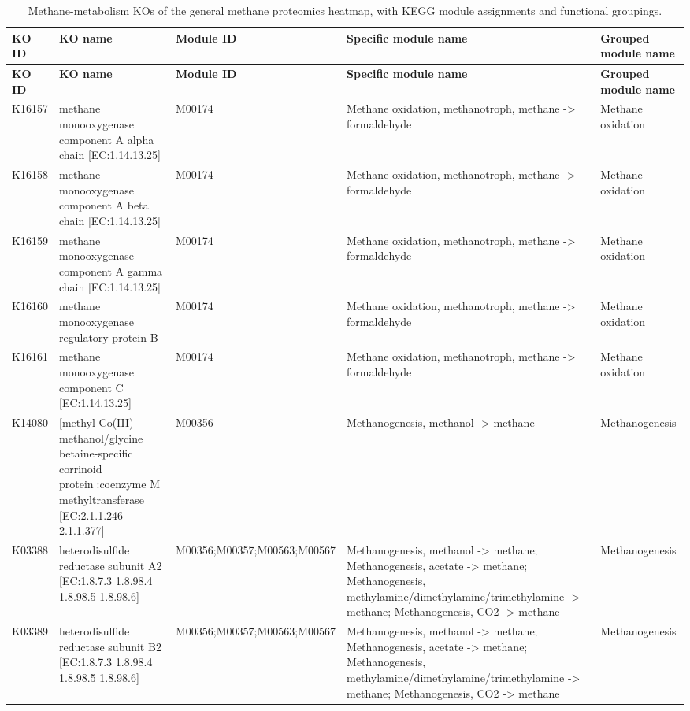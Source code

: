 {\small
\begin{longtable}{|l|p{4.5cm}|p{2.3cm}|p{3.7cm}|p{2.5cm}|}
\caption{Methane-metabolism KOs of the general methane proteomics heatmap, with KEGG module assignments and functional groupings.}\label{table:methane_ko}\\
\hline
\textbf{KO ID} & \textbf{KO name} & \textbf{Module ID} & \textbf{Specific module name} & \textbf{Grouped module name} \\ \hline
\endfirsthead
\hline
\textbf{KO ID} & \textbf{KO name} & \textbf{Module ID} & \textbf{Specific module name} & \textbf{Grouped module name} \\ \hline
\endhead
K16157 & methane monooxygenase component A alpha chain [EC:1.14.13.25] & M00174 & Methane oxidation, methanotroph, methane -> formaldehyde & Methane oxidation \\ \hline
K16158 & methane monooxygenase component A beta chain [EC:1.14.13.25] & M00174 & Methane oxidation, methanotroph, methane -> formaldehyde & Methane oxidation \\ \hline
K16159 & methane monooxygenase component A gamma chain [EC:1.14.13.25] & M00174 & Methane oxidation, methanotroph, methane -> formaldehyde & Methane oxidation \\ \hline
K16160 & methane monooxygenase regulatory protein B & M00174 & Methane oxidation, methanotroph, methane -> formaldehyde & Methane oxidation \\ \hline
K16161 & methane monooxygenase component C [EC:1.14.13.25] & M00174 & Methane oxidation, methanotroph, methane -> formaldehyde & Methane oxidation \\ \hline
K14080 & [methyl-Co(III) methanol/glycine betaine-specific corrinoid protein]:coenzyme M methyltransferase [EC:2.1.1.246 2.1.1.377] & M00356 & Methanogenesis, methanol -> methane & Methanogenesis \\ \hline
K03388 & heterodisulfide reductase subunit A2 [EC:1.8.7.3 1.8.98.4 1.8.98.5 1.8.98.6] & M00356;M00357;M00563;M00567 & Methanogenesis, methanol -> methane; Methanogenesis, acetate -> methane; Methanogenesis, methylamine/dimethylamine/trimethylamine -> methane; Methanogenesis, CO2 -> methane & Methanogenesis \\ \hline
K03389 & heterodisulfide reductase subunit B2 [EC:1.8.7.3 1.8.98.4 1.8.98.5 1.8.98.6] & M00356;M00357;M00563;M00567 & Methanogenesis, methanol -> methane; Methanogenesis, acetate -> methane; Methanogenesis, methylamine/dimethylamine/trimethylamine -> methane; Methanogenesis, CO2 -> methane & Methanogenesis \\ \hline

\end{longtable}}
